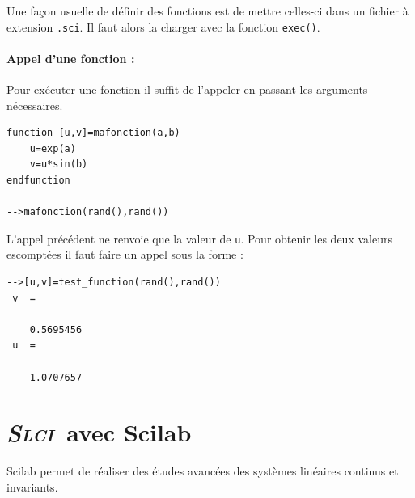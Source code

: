 Une façon usuelle de définir des fonctions est de mettre 
celles-ci dans un fichier à extension \verb?.sci?. 
Il faut alors la charger avec la fonction \verb?exec()?.

\paragraph{Appel d'une fonction :}
Pour exécuter une fonction il suffit de l'appeler en passant les arguments 
nécessaires.
\begin{code}
\begin{verbatim}
function [u,v]=mafonction(a,b)
    u=exp(a)
    v=u*sin(b)
endfunction

-->mafonction(rand(),rand())
\end{verbatim}
\end{code}
L'appel précédent ne renvoie que la valeur de \verb?u?. 
Pour obtenir les deux valeurs escomptées il faut faire un appel sous la forme  :
\begin{code}
\begin{verbatim}
-->[u,v]=test_function(rand(),rand())
 v  =
 
    0.5695456  
 u  =
 
    1.0707657  
\end{verbatim}
\end{code}



\section{\emph{{\scshape Slci}}~avec Scilab}

Scilab permet de réaliser des études avancées des systèmes linéaires continus 
et invariants.


